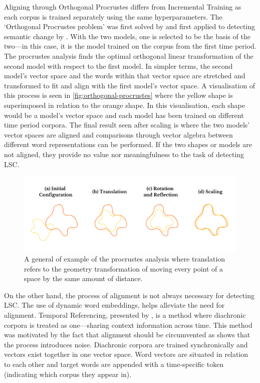 Aligning through Orthogonal Procrustes differs from Incremental Training as each corpus is trained separately using the same hyperparameters. The `Orthogonal Procrustes problem' was first solved by \citet{schonemann1966} and first applied to detecting semantic change by \citet{hamilton-etal-2016-diachronic}. With the two models, one is selected to be the basis of the two—in this case, it is the model trained on the corpus from the first time period. The procrustes analysis finds the optimal orthogonal linear transformation of the second model with respect to the first model. In simpler terms, the second model’s vector space and the words within that vector space are stretched and transformed to fit and align with the first model’s vector space. A visualisation of this process is seen in \autoref{fig:orthogonal-procrustes} where the yellow shape is superimposed in relation to the orange shape. In this visualisation, each shape would be a model's vector space and each model has been trained on different time period corpora. The final result seen after scaling is where the two models' vector spaces are aligned and comparisons through vector algebra between different word representations can be performed. If the two shapes or models are not aligned, they provide no value nor meaningfulness to the task of detecting LSC. 

\begin{figure}[h]
  \centering
  \includegraphics[width=1\linewidth]{sections/figures/orthogonal-procrustes.png}
  \caption{A general of example of the procrustes analysis where translation refers to the geometry transformation of moving every point of a space by the same amount of distance.}
  \label{fig:orthogonal-procrustes}
\end{figure}


On the other hand, the process of alignment is not always necessary for detecting LSC. The use of dynamic word embeddings, helps alleviate the need for alignment. Temporal Referencing, presented by \citet{dubossarsky-etal-2019-time}, is a method where diachronic corpora is treated as one—sharing context information across time. This method was motivated by the fact that alignment should be circumvented as \citet{dubossarsky-etal-2017-outta} shows that the process introduces noise.  Diachronic corpora are trained synchronically and vectors exist together in one vector space. Word vectors are situated in relation to each other and target words are appended with a time-specific token (indicating which corpus they appear in).